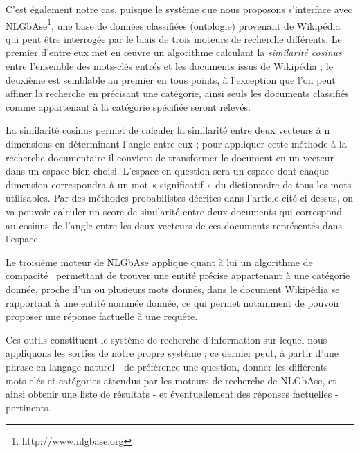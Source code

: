 \documentclass[10pt,a4paper]{article}
\begin{document}
\par C'est également notre cas, puisque le système que nous proposons s'interface avec NLGbAse\footnote{http://www.nlgbase.org}, une base de données classifiées (ontologie) provenant de Wikipédia qui peut être interrogée par le biais de trois moteurs de recherche différents. Le premier d'entre eux met en {\oe}uvre un algorithme calculant la \emph{similarité cosinus}~\cite{salton:paper} entre l'ensemble des mots-clés entrés et les documents issus de Wikipédia ; le deuxième est semblable au premier en tous points, à l'exception que l'on peut affiner la recherche en précisant une catégorie, ainsi seuls les documents classifiés comme appartenant à la catégorie spécifiée seront relevés. 
\par La similarité cosinus permet de calculer la similarité entre deux vecteurs à n dimensions en déterminant l'angle entre eux ; pour appliquer cette méthode à la recherche documentaire il convient de transformer le document en un vecteur dans un espace bien choisi. L'espace en question sera un espace dont chaque dimension correspondra à un mot « significatif » du dictionnaire de tous les mots utilisables. Par des méthodes probabilistes décrites dans l'article cité ci-dessus, on va pouvoir calculer un score de similarité entre deux documents qui correspond au cosinus de l'angle entre les deux vecteurs de ces documents représentés dans l'espace. 
\par Le troisième moteur de NLGbAse applique quant à lui un algorithme de compacité~\cite{gillard:paper} permettant de trouver une entité précise appartenant à une catégorie donnée, proche d'un ou plusieurs mots donnés, dans le document Wikipédia se rapportant à une entité nommée donnée, ce qui permet notamment de pouvoir proposer une réponse factuelle à une requête.

\par Ces outils constituent le système de recherche d'information sur lequel nous appliquons les sorties de notre propre système ; ce dernier peut, à partir d'une phrase en langage naturel - de préférence une question, donner les différents mots-clés et catégories attendus par les moteurs de recherche de NLGbAse, et ainsi obtenir une liste de résultats - et éventuellement des réponses factuelles - pertinents.

\end{document}
